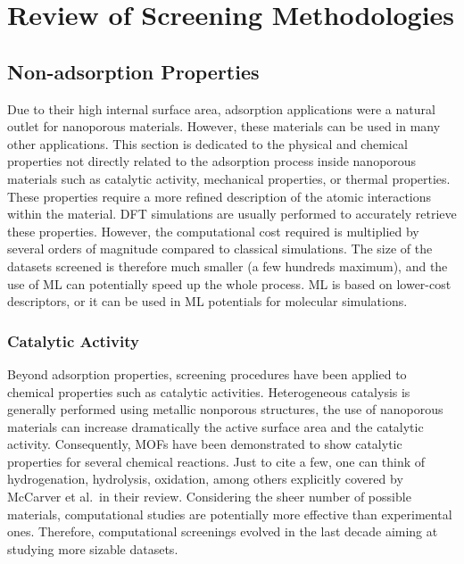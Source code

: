 \documentclass[main.tex]{subfiles}
\begin{document}
\section{Review of Screening Methodologies}


\subsection{Non-adsorption Properties}

Due to their high internal surface area, adsorption applications were a natural outlet for nanoporous materials. However, these materials can be used in many other applications. This section is dedicated to the physical and chemical properties not directly related to the adsorption process inside nanoporous materials such as catalytic activity,\cite{Singh_2015, Greeley_2006, Back_2020}
mechanical properties,\cite{Chibani_2019, Gaillac_2020}
or thermal properties.\cite{Toher_2014, Sarikurt_2020, Ducamp_2021} These properties require a more refined description of the atomic interactions within the material. DFT simulations are usually performed to accurately retrieve these properties. However, the computational cost required is multiplied by several orders of magnitude compared to classical simulations. The size of the datasets screened is therefore much smaller (a few hundreds maximum), and the use of ML can potentially speed up the whole process. ML is based on lower-cost descriptors,\cite{Evans_2017, Ducamp_2022} or it can be used in ML potentials for molecular simulations\cite{Eckhoff_2019,Friederich_2021}.

\subsubsection{Catalytic Activity}

Beyond adsorption properties, screening procedures have been applied to chemical properties such as catalytic activities. Heterogeneous catalysis is generally performed using metallic nonporous structures, the use of nanoporous materials can increase dramatically the active surface area and the catalytic activity. Consequently, MOFs have been demonstrated to show catalytic properties for several chemical reactions. Just to cite a few, one can think of hydrogenation, hydrolysis, oxidation, among others explicitly covered by McCarver et al.\ in their review.\cite{McCarver_2021}
Considering the sheer number of possible materials, computational studies are potentially more effective than experimental ones. Therefore, computational screenings evolved in the last decade aiming at studying more sizable datasets.
\end{document}
